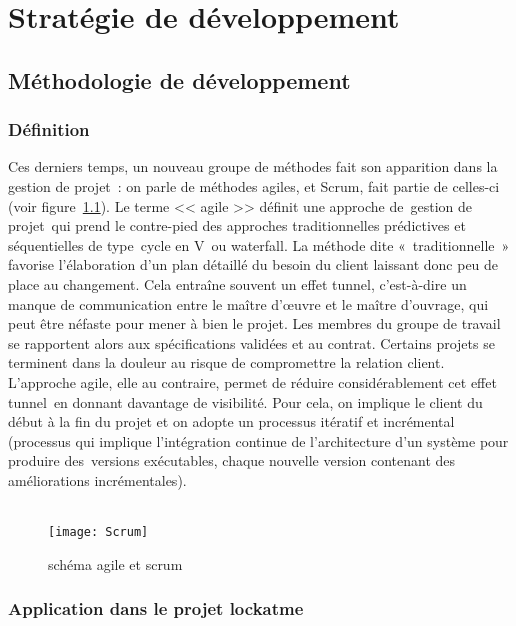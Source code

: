 \chapter{Stratégie de développement}
\newpage

\section{Méthodologie de développement}
\subsection{Définition}

Ces derniers temps, un nouveau groupe de méthodes fait son apparition dans la
gestion de projet : on parle de méthodes agiles, et Scrum, fait partie de
celles-ci (voir figure~\ref{fig:scrum}). Le terme << agile >> définit une approche de gestion
de projet qui prend le contre-pied des approches traditionnelles prédictives et
séquentielles de type cycle en V ou waterfall.
La méthode dite « traditionnelle » favorise l’élaboration d’un plan détaillé
du besoin du client laissant donc peu de place au changement. Cela entraîne
souvent un effet tunnel, c’est-à-dire un manque de communication entre le
maître d’œuvre et le maître d’ouvrage, qui peut être néfaste pour mener à bien
le projet. Les membres du groupe de travail se rapportent alors aux
spécifications validées et au contrat. Certains projets se terminent dans la
douleur au risque de compromettre la relation client.
L’approche agile, elle au contraire, permet de réduire considérablement cet
effet tunnel en donnant davantage de visibilité. Pour cela, on implique le
client du début à la fin du projet et on adopte un processus itératif et
incrémental (processus qui implique l'intégration continue de l'architecture
d'un système pour produire des versions exécutables, chaque nouvelle version
contenant des améliorations incrémentales).
\\
\\

\begin{figure}[h]\label{fig:scrum}
  \texttt{[image: Scrum]}
  \caption{schéma agile et scrum}
  \label{fig:scrum}
\end{figure}

\newpage
\subsection{Application dans le projet lockatme}

